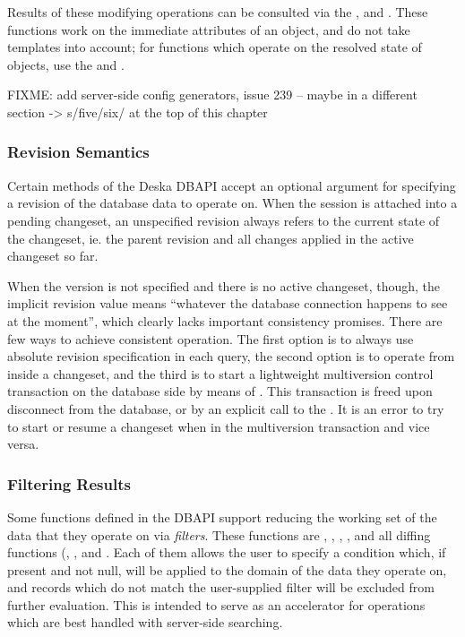 \documentclass{article}
\begin{document}
Results of these modifying operations can be consulted via the ,
 and .  These functions work on the
immediate attributes of an object, and do not take templates into account; for functions which operate on the resolved
state of objects, use the  and
.

FIXME: add server-side config generators, issue 239 -- maybe in a different section -> s/five/six/ at the top of this chapter

\subsubsection{Revision Semantics}
\label{sec:api-revision-semantics}

Certain methods of the Deska DBAPI accept an optional argument for specifying a revision of the database data to
operate on.  When the session is attached into a pending changeset, an unspecified revision always refers to the current
state of the changeset, ie. the parent revision and all changes applied in the active changeset so far.

When the version is not specified and there is no active changeset, though, the implicit revision value means ``whatever
the database connection happens to see at the moment'', which clearly lacks important consistency promises.  There are
few ways to achieve consistent operation.  The first option is to always use absolute revision specification in each
query,  the second option is to operate from inside a changeset, and the third is to start a lightweight multiversion
control transaction on the database side by means of .  This transaction is freed upon
disconnect from the database, or by an explicit call to the .  It is an error to try to start
or resume a changeset when in the multiversion transaction and vice versa.

\subsubsection{Filtering Results}
\label{sec:api-filters}

Some functions defined in the DBAPI support reducing the working set of the data that they operate on via {\em filters}.
These functions are , ,
, ,  and all
diffing functions (, ,
 and .  Each of them
allows the user to specify a condition which, if present and not null, will be applied to the domain of the data they
operate on, and records which do not match the user-supplied filter will be excluded from further evaluation.  This is
intended to serve as an accelerator for operations which are best handled with server-side searching.
\end{document}
